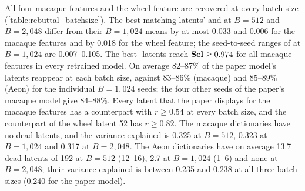 All four macaque features and the wheel feature are recovered at every batch size (\autoref{table:rebuttal_batchsize}). The best-matching latents'  and  at $B=512$ and $B=2{,}048$ differ from their $B=1{,}024$ means by at most 0.033  and 0.006  for the macaque features and by 0.018  for the wheel feature; the seed-to-seed ranges of  at $B=1{,}024$ are 0.007--0.105. The best- latents reach $\mathbf{Sel}\geq0.974$ for all macaque features in every retrained model. On average 82--87\% of the paper model's latents reappear at each batch size, against 83--86\% (macaque) and 85--89\% (Aeon) for the individual $B=1{,}024$ seeds; the four other seeds of the paper's macaque model give 84--88\%. Every latent that the paper displays for the macaque features has a counterpart with $r\geq0.54$ at every batch size, and the counterpart of the wheel latent 52 has $r\geq0.82$. The macaque dictionaries have no dead latents, and the variance explained is 0.325 at $B=512$, 0.323 at $B=1{,}024$ and 0.317 at $B=2{,}048$. The Aeon dictionaries have on average 13.7 dead latents of 192 at $B=512$ (12--16), 2.7 at $B=1{,}024$ (1--6) and none at $B=2{,}048$; their variance explained is between 0.235 and 0.238 at all three batch sizes (0.240 for the paper model).

\begin{table}[!htbp]
    \centering
    {\scriptsize\setlength{\tabcolsep}{4pt}\renewcommand{\arraystretch}{1.1}
    }
    \caption{\textbf{Retraining at three batch sizes at fixed $k$ and a fixed number of training examples.} Entries give the mean over three seeds and, in brackets, the range; the paper model is a single run. Each feature row reports the  of the highest- eligible latent and the  of the highest- eligible latent (macaque), or both scores of the highest- latent (the single latent the paper shows for the wheel feature); latents are selected separately in each model. Latents are active when $z>0$, so the wheel  of the paper model (0.744) is its value at $z>0$ rather than at the operating point $z\geq3.31$ used in the main-text table. ``Latents reappearing'' is the share of the paper model's 192 latents whose most correlated latent in the retrained model has correlation $r\geq0.5$ over the same windows. Dead latents never activate on any window. Variance explained is $1-\mathrm{MSE}/\mathrm{variance}$ of the neural reconstruction at the largest Matryoshka level.}
    \label{table:rebuttal_batchsize}
\end{table}
